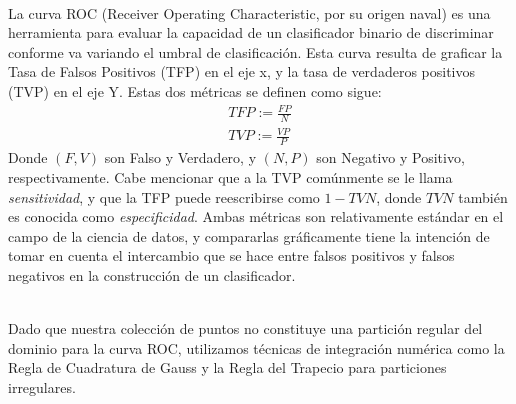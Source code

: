 \noindent
\\
La curva ROC (Receiver Operating Characteristic, por su origen naval) es una herramienta para evaluar la capacidad de un clasificador binario de discriminar conforme va variando el umbral de clasificación. Esta curva resulta de graficar la Tasa de Falsos Positivos (TFP) en el eje x, y la tasa de verdaderos positivos (TVP) en el eje Y. Estas dos métricas se definen como sigue:
\begin{align*}
    TFP := \frac{FP}{N} \\
    TVP := \frac{VP}{P}
\end{align*}
Donde $(F,V)$ son Falso y Verdadero, y $(N,P)$ son Negativo y Positivo, respectivamente. Cabe mencionar que a la TVP comúnmente se le llama \textit{sensitividad}, y que la TFP puede reescribirse como $1-TVN$, donde $TVN$ también es conocida como \textit{especificidad}. Ambas métricas son relativamente estándar en el campo de la ciencia de datos, y compararlas gráficamente tiene la intención de tomar en cuenta el intercambio que se hace entre falsos positivos y falsos negativos en la construcción de un clasificador.
\par
\noindent
\\
Dado que nuestra colección de puntos no constituye una partición regular del dominio para la curva ROC, utilizamos técnicas de integración numérica como la Regla de Cuadratura de Gauss y la Regla del Trapecio para particiones irregulares.
